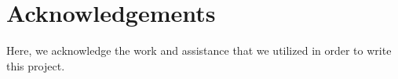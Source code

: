 \section{Acknowledgements}
Here, we acknowledge the work and assistance that we utilized in order to write this project.